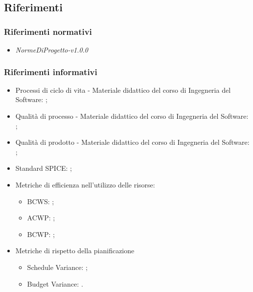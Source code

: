 \subsection{Riferimenti}
\subsubsection{Riferimenti normativi}
\begin{itemize}
    \item \textit{NormeDiProgetto-v1.0.0}
\end{itemize}
\subsubsection{Riferimenti informativi}
\begin{itemize}
    \item Processi di ciclo di vita - Materiale didattico del corso di Ingegneria del Software: ;
    \item Qualità di processo - Materiale didattico del corso di Ingegneria del Software: ;
    \item Qualità di prodotto - Materiale didattico del corso di Ingegneria del Software: ;
    \item Standard SPICE: ;
    \item Metriche di efficienza nell'utilizzo delle risorse:
    \begin{itemize}
        \item BCWS: ;
        \item ACWP: ;
        \item BCWP: ;
    \end{itemize}
    \item Metriche di rispetto della pianificazione
    \begin{itemize}
        \item Schedule Variance: ;
        \item Budget Variance: .
    \end{itemize}
\end{itemize}